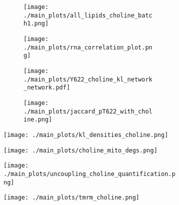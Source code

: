 \begin{figure}[H]
    \begin{subfigure}[t]{.24\textwidth}
        \begin{subfigure}[t]{\textwidth}
            \caption{}
            \texttt{[image: ./main\_plots/all\_lipids\_choline\_batch1.png]}        
        \end{subfigure} 
        \begin{subfigure}[t]{\textwidth}
            \caption{}
            \vspace{-0.5cm}
            \centering
            \texttt{[image: ./main\_plots/rna\_correlation\_plot.png]}        
        \end{subfigure}  
    \end{subfigure}  
    \hspace{.5cm}
    \begin{subfigure}[t]{.23\textwidth}
        \begin{subfigure}[t]{\textwidth}
            \caption{}
            \texttt{[image: ./main\_plots/Y622\_choline\_kl\_network\_network.pdf]}        
        \end{subfigure}  
        \begin{subfigure}[t]{\textwidth}
            \caption{}
            \texttt{[image: ./main\_plots/jaccard\_pT622\_with\_choline.png]}        
        \end{subfigure} 
    \end{subfigure} 
    \hspace{.25cm}
    \begin{subfigure}[t]{.45\textwidth}
        \caption{}
        \texttt{[image: ./main\_plots/kl\_densities\_choline.png]}        
    \end{subfigure}  
    \begin{subfigure}[t]{.3\textwidth}
        \caption{}
        \texttt{[image: ./main\_plots/choline\_mito\_degs.png]}        
    \end{subfigure}  
    \hspace{.4cm} 
    \begin{subfigure}[t]{.2\textwidth}
        \caption{}
        \texttt{[image: ./main\_plots/uncoupling\_choline\_quantification.png]}        
    \end{subfigure}  
    \hspace{.4cm}  
    \begin{subfigure}[t]{.4\textwidth}
        \caption{}
        \vspace{-0.15cm}
        \texttt{[image: ./main\_plots/tmrm\_choline.png]}        
    \end{subfigure} 
   

\end{figure}
